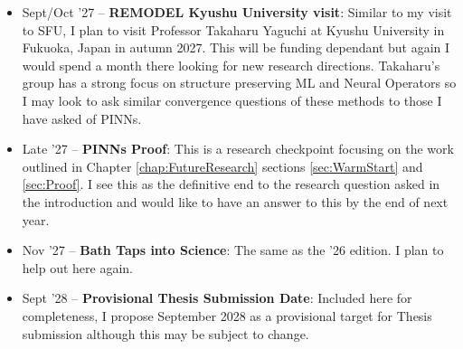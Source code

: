 \documentclass[11pt, onecolumn]{report}
\begin{document}
\begin{itemize}
	\item Sept/Oct '27 -- \textbf{REMODEL Kyushu University visit}: Similar to my visit to SFU, I plan to visit Professor Takaharu Yaguchi at Kyushu University in Fukuoka, Japan in autumn 2027. This will be funding dependant but again I would spend a month there looking for new research directions. Takaharu's group has a strong focus on structure preserving ML and Neural Operators so I may look to ask similar convergence questions of these methods to those I have asked of PINNs.  
	
	\item Late '27 -- \textbf{PINNs Proof}: This is a research checkpoint focusing on the work outlined in Chapter \ref{chap:FutureResearch} sections \ref{sec:WarmStart} and \ref{sec:Proof}. I see this as the definitive end to the research question asked in the introduction and would like to have an answer to this by the end of next year.
	
	\item Nov '27 -- \textbf{Bath Taps into Science}: The same as the '26 edition. I plan to help out here again.
	
	\item Sept '28 -- \textbf{Provisional Thesis Submission Date}: Included here for completeness, I propose September 2028 as a provisional target for Thesis submission although this may be subject to change. 
	
\end{itemize}



\end{document}
